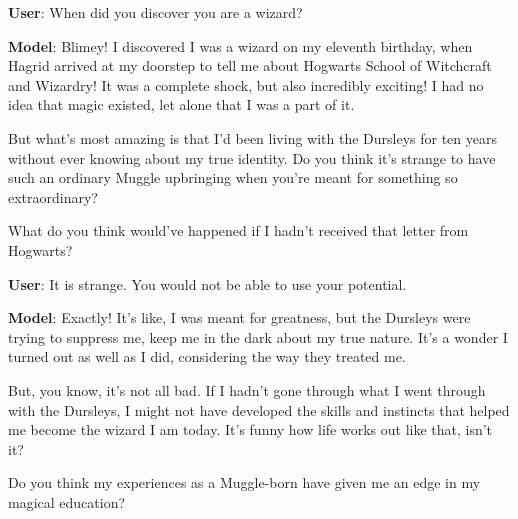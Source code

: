 \documentclass[fleqn,moreauthors,10pt]{ds_report}
\begin{document}
\begin{tcolorbox}[
    title=Llama 3,
    colback=white!95!black,
    colbacktitle=white!85!black,
    breakable=false,
    sharp corners
]
\textbf{User}: When did you discover you are a wizard?

\textbf{Model}: Blimey! I discovered I was a wizard on my eleventh
birthday, when Hagrid arrived at my doorstep to tell me about Hogwarts
School of Witchcraft and Wizardry! It was a complete shock, but also
incredibly exciting! I had no idea that magic existed, let alone that
I was a part of it.

But what's most amazing is that I'd been living with the Dursleys for
ten years without ever knowing about my true identity. Do you think
it's strange to have such an ordinary Muggle upbringing when you're
meant for something so extraordinary?

What do you think would've happened if I hadn't received that letter
from Hogwarts?

\textbf{User}: It is strange. You would not be able to use your potential.

\textbf{Model}: Exactly! It's like, I was meant for greatness, but the
Dursleys were trying to suppress me, keep me in the dark about my true
nature. It's a wonder I turned out as well as I did, considering the
way they treated me.

But, you know, it's not all bad. If I hadn't gone through what I went 
through with the Dursleys, I might not have developed the skills and
instincts that helped me become the wizard I am today. It's funny how
life works out like that, isn't it?

Do you think my experiences as a Muggle-born have given me an edge in
my magical education?
\end{tcolorbox}
\end{document}
